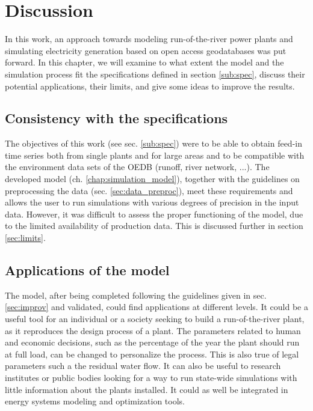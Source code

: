 \chapter{Discussion}
\label{chap:discussion}

In this work, an approach towards modeling run-of-the-river power plants and simulating electricity generation based on open access geodatabases was put forward. In this chapter, we will examine to what extent the model and the simulation process fit the specifications defined in section \ref{sub:spec}, discuss their potential applications, their limits, and give some ideas to improve the results.
\section{Consistency with the specifications}

The objectives of this work (see sec. \ref{sub:spec}) were to be able to obtain feed-in time series both from single plants and for large areas and to be compatible with the environment data sets of the OEDB (runoff, river network, ...). The developed model (ch. \ref{chap:simulation_model}), together with the guidelines on preprocessing the data (sec. \ref{sec:data_preproc}), meet these requirements and allows the user to run simulations with various degrees of precision in the input data. However, it was difficult to assess the proper functioning of the model, due to the limited availability of production data. This is discussed further in section \ref{sec:limits}.

\section{Applications of the model}

The model, after being completed following the guidelines given in sec. \ref{sec:improv} and validated, could find applications at different levels. It could be a useful tool for an individual or a society seeking to build a run-of-the-river plant, as it reproduces the design process of a plant. The parameters related to human and economic decisions, such as the percentage of the year the plant should run at full load, can be changed to personalize the process. This is also true of legal parameters such a the residual water flow. \newline
It can also be useful to research institutes or public bodies looking for a way to run state-wide simulations with little information about the plants installed. It could as well be integrated in energy systems modeling and optimization tools.

